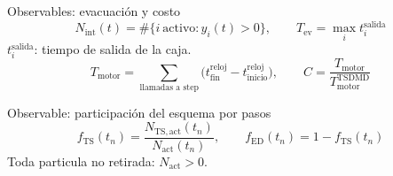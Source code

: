 \documentclass[aspectratio=169,20pt]{beamer}
\newcommand{\notaBreve}[1]{{\fontsize{18}{22}\selectfont #1}}
\begin{document}
\begin{frame}{Observables: evacuación y costo}
\[
 N_{\mathrm{int}}(t)=\#\{i\ \text{activo}:y_i(t)>0\},\qquad
 T_{\mathrm{ev}}=\max_i t_i^{\mathrm{salida}}
\]
\notaBreve{$t_i^{\mathrm{salida}}$: tiempo de salida de la caja.}
\vspace{5mm}
\[
 T_{\mathrm{motor}}=\sum_{\text{llamadas a step}}\bigl(t_{\mathrm{fin}}^{\mathrm{reloj}}-t_{\mathrm{inicio}}^{\mathrm{reloj}}\bigr),\qquad
 C=\frac{T_{\mathrm{motor}}}{T_{\mathrm{motor}}^{\mathrm{TSDMD}}}
\]
\vfill
\end{frame}

\begin{frame}{Observable: participación del esquema por pasos}
\[
 f_{\mathrm{TS}}(t_n)=\frac{N_{\mathrm{TS,act}}(t_n)}{N_{\mathrm{act}}(t_n)},\qquad
 f_{\mathrm{ED}}(t_n)=1-f_{\mathrm{TS}}(t_n)
\]
\notaBreve{Toda particula no retirada: $N_{\mathrm{act}}>0$.}
\par\vspace{7mm}
\vfill
\end{frame}
\end{document}
